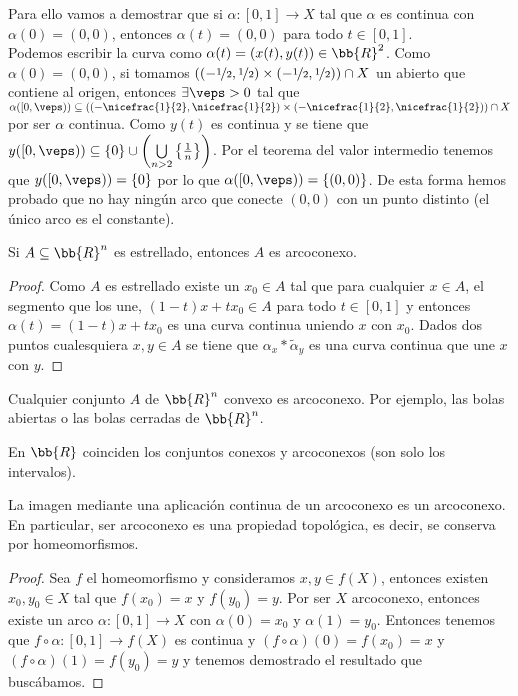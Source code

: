 \begin{ejemplo}
    Para ello vamos a demostrar que si $\alpha:[0,1]\to X$ tal que $\alpha$ es continua con $\alpha(0)=(0,0)$, entonces $\alpha(t)=(0,0)$ para todo $t\in [0,1]$.\\

    Podemos escribir la curva como $\alpha(t) = (x(t), y(t))\in \bb{R}^2$. Como $\alpha(0)=(0,0)$, si tomamos $((-\nicefrac{1}{2}, \nicefrac{1}{2})\times (-\nicefrac{1}{2}, \nicefrac{1}{2})) \cap X$ un abierto que contiene al origen, entonces $\exists \veps > 0$ tal que $\alpha([0,\veps))\subseteq ((-\nicefrac{1}{2}, \nicefrac{1}{2})\times (-\nicefrac{1}{2}, \nicefrac{1}{2})) \cap X$ por ser $\alpha$ continua. Como $y(t)$ es continua y se tiene que $y([0,\veps))\subseteq \{0\}\cup\left(\bigcup\limits_{n>2} \left\{\frac{1}{n}\right\}\right)$. Por el teorema del valor intermedio tenemos que $y([0,\veps)) = \{0\}$ por lo que $\alpha([0,\veps))=\{(0,0)\}$. De esta forma hemos probado que no hay ningún arco que conecte $(0,0)$ con un punto distinto (el único arco es el constante).
\end{ejemplo}

\begin{teo}
    Si $A\subseteq \bb{R}^n$ es estrellado, entonces $A$ es arcoconexo.
    \begin{proof}
        Como $A$ es estrellado existe un $x_0\in A$ tal que para cualquier $x\in A$, el segmento que los une, $(1-t)x + tx_0\in A$ para todo $t\in [0,1]$ y entonces $\alpha(t)=(1-t)x+tx_0$ es una curva continua uniendo $x$ con $x_0$. Dados dos puntos cualesquiera $x,y \in A$ se tiene que $\alpha_x\ast \tilde{\alpha}_y$ es una curva continua que une $x$ con $y$.
    \end{proof}
\end{teo}

\begin{coro}
    Cualquier conjunto $A$ de $\bb{R}^n$ convexo es arcoconexo. Por ejemplo, las bolas abiertas o las bolas cerradas de $\bb{R}^n$.
\end{coro}

\begin{coro}
    En $\bb{R}$ coinciden los conjuntos conexos y arcoconexos (son solo los intervalos).
\end{coro}

\begin{teo}
    La imagen mediante una aplicación continua de un arcoconexo es un arcoconexo. En particular, ser arcoconexo es una propiedad topológica, es decir, se conserva por homeomorfismos.
    \begin{proof}
        Sea $f$ el homeomorfismo y consideramos $x,y\in f(X)$, entonces existen $x_0,y_0\in X$ tal que $f(x_0)=x$ y $f(y_0) = y$. Por ser $X$ arcoconexo, entonces existe un arco $\alpha:[0,1]\to X$ con $\alpha(0)=x_0$ y $\alpha(1)=y_0$. Entonces tenemos que $f\circ \alpha: [0,1]\to f(X)$ es continua y $(f\circ \alpha)(0) = f(x_0) = x$ y $(f\circ\alpha)(1) = f(y_0) = y$ y tenemos demostrado el resultado que buscábamos.
    \end{proof}
\end{teo}

